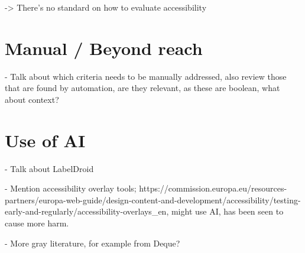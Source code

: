 -> There's no standard on how to evaluate accessibility


\section{Manual / Beyond reach}

- Talk about which criteria needs to be manually addressed, also review those that are found by automation, are they relevant, as these are boolean, what about context?

\section{Use of AI}

- Talk about LabelDroid

- Mention accessibility overlay tools; https://commission.europa.eu/resources-partners/europa-web-guide/design-content-and-development/accessibility/testing-early-and-regularly/accessibility-overlays_en, might use AI, has been seen to cause more harm.

- More gray literature, for example from Deque?